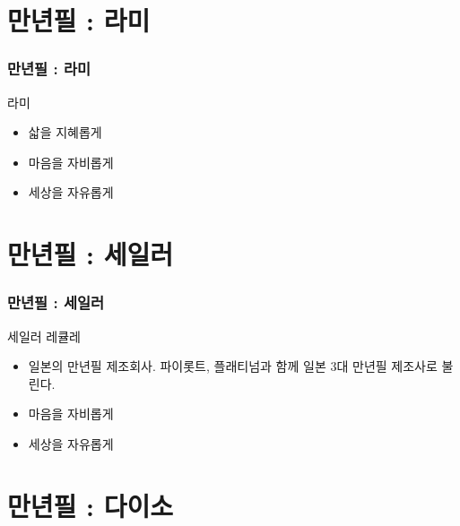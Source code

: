 \documentclass[aspectratio=1610,20pt,xcolor=pdftex,dvipsnames,table,handout]{beamer}
\begin{document}
		\section{만년필 : 라미 }

		\begin{frame} [t,plain]
		\frametitle{만년필 : 라미}

			\begin{block} {라미}
			\setlength{\leftmargini}{2em}			
			\begin{itemize}
				\item 삷을 지혜롭게
				\item 마음을 자비롭게
				\item 세상을 자유롭게
			\end{itemize}
			\end{block}						

		\end{frame}						


		\section{만년필 : 세일러 }

		\begin{frame} [t,plain]
		\frametitle{만년필 : 세일러 }

			\begin{block} {세일러 레큘레}
			\setlength{\leftmargini}{2em}			
			\begin{itemize}
				\item 일본의 만년필 제조회사. 파이롯트, 플래티넘과 함께 일본 3대 만년필 제조사로 불린다.
				\item 마음을 자비롭게
				\item 세상을 자유롭게
			\end{itemize}
			\end{block}						

		\end{frame}						


		\section{만년필 : 다이소 }
\end{document}
